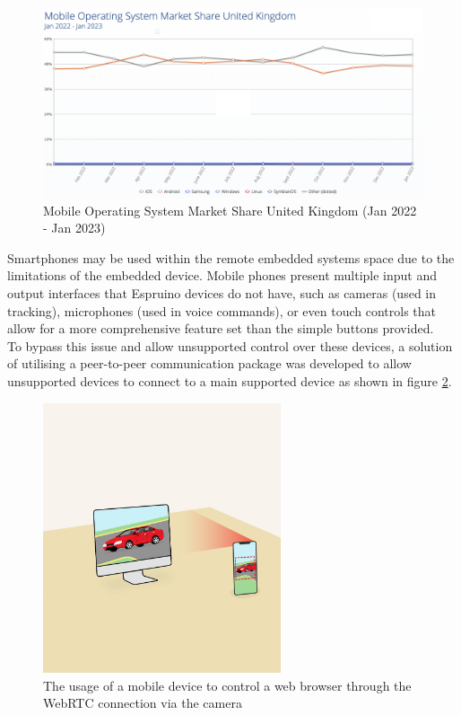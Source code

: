 \documentclass{l4proj}
\begin{document}
\begin{figure}[!ht]
    \centering
    \includegraphics[width=12cm]{dissertation/images/mobile-operating-system-usage.png}
    \caption{Mobile Operating System Market Share United Kingdom (Jan 2022 - Jan 2023)}
    \label{fig:smartdeviceusage}
\end{figure}

Smartphones may be used within the remote embedded systems space due to the limitations of the embedded device. Mobile phones present multiple input and output interfaces that Espruino devices do not have, such as cameras (used in tracking), microphones (used in voice commands), or even touch controls that allow for a more comprehensive feature set than the simple buttons provided.
\\ 

To bypass this issue and allow unsupported control over these devices, a solution of utilising a peer-to-peer communication package was developed to allow unsupported devices to connect to a main supported device as shown in figure \ref{fig:mobile-computer-connection}. 

\begin{figure}[!ht]
    \centering
    \includegraphics[width=7cm]{dissertation/images/mobile-computer-connection.png}
    \caption{The usage of a mobile device to control a web browser through the WebRTC connection via the camera}
    \label{fig:mobile-computer-connection}
\end{figure}
\end{document}
